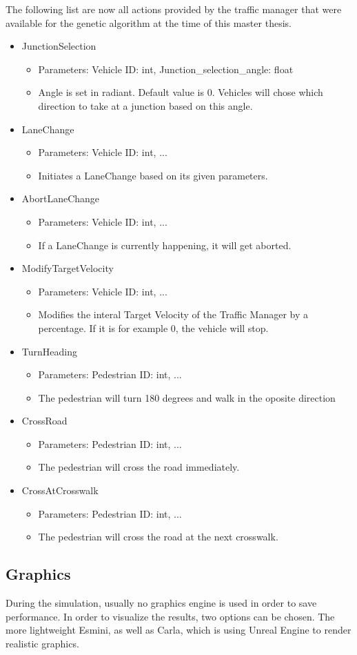 The following list are now all actions provided by the traffic manager that were available for the genetic algorithm at the time of this master thesis.
\begin{itemize}
	\item JunctionSelection
	\begin{itemize}
		\item Parameters: Vehicle ID: int, Junction\_selection\_angle: float
		\item Angle is set in radiant. Default value is 0. Vehicles will chose which direction to take at a junction based on this angle.
	\end{itemize}
	\item LaneChange
	\begin{itemize}
		\item Parameters: Vehicle ID: int, ...
		\item Initiates a LaneChange based on its given parameters.
	\end{itemize}
	\item AbortLaneChange
	\begin{itemize}
		\item Parameters: Vehicle ID: int, ...
		\item If a LaneChange is currently happening, it will get aborted.
	\end{itemize}
	\item ModifyTargetVelocity
	\begin{itemize}
		\item Parameters: Vehicle ID: int, ...
		\item Modifies the interal Target Velocity of the Traffic Manager by a percentage. If it is for example 0, the vehicle will stop.
	\end{itemize}
	\item TurnHeading
	\begin{itemize}
		\item Parameters: Pedestrian ID: int, ...
		\item The pedestrian will turn 180 degrees and walk in the oposite direction
	\end{itemize}
	\item CrossRoad
	\begin{itemize}
		\item Parameters: Pedestrian ID: int, ...
		\item The pedestrian will cross the road immediately.
	\end{itemize}
	\item CrossAtCrosswalk
	\begin{itemize}
		\item Parameters: Pedestrian ID: int, ...
		\item The pedestrian will cross the road at the next crosswalk.
	\end{itemize}
\end{itemize}


\subsection{Graphics}
During the simulation, usually no graphics engine is used in order to save performance. In order to visualize the results, two options can be chosen. The more lightweight Esmini, as well as Carla, which is using Unreal Engine to render realistic graphics.


